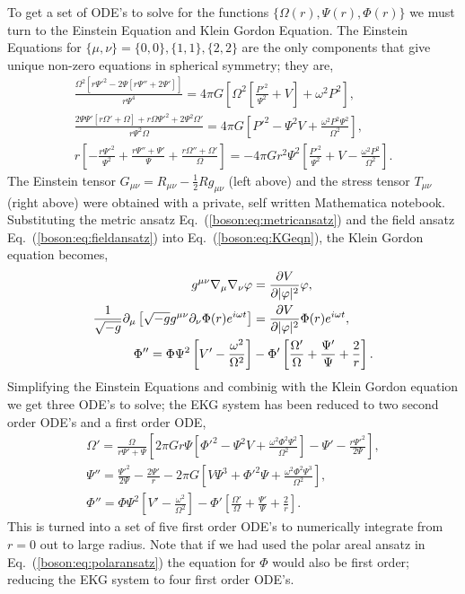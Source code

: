 To get a set of ODE's to solve for the functions $\{\Omega(r), \Psi(r),\Phi(r)\}$ we must turn to the Einstein Equation and Klein Gordon Equation. The Einstein Equations for $\{\mu,\nu\}=\{0,0\},\{1,1\},\{2,2\}$ are the only components that give unique non-zero equations in spherical symmetry; they are,
\begin{gather}
\frac{\Omega ^2 \left[r \Psi '^2-2 \Psi  \left[r \Psi ''+2 \Psi '\right]\right]}{r \Psi ^4} = 4\pi G \left[\Omega ^2 \left[\frac{P'^2}{\Psi ^2}+V\right]+\omega ^2 P^2\right],\\
\frac{2 \Psi  \Psi ' \left[r \Omega '+\Omega \right]+r \Omega  \Psi '^2+2 \Psi ^2 \Omega
   '}{r \Psi ^2 \Omega } = 4\pi G \left[P'^2-\Psi ^2 V+\frac{\omega ^2 P^2 \Psi ^2}{\Omega
   ^2}\right],\\
   r \left[-\frac{r \Psi '^2}{\Psi ^2}+\frac{r \Psi ''+\Psi '}{\Psi }+\frac{r \Omega ''+\Omega
   '}{\Omega }\right] = -4\pi G r^2 \Psi ^2 \left[\frac{P'^2}{\Psi ^2}+V-\frac{\omega ^2 P^2}{\Omega
   ^2}\right].
   \end{gather}
  The Einstein tensor $G_{\mu\nu} = R_{\mu\nu}-\frac{1}{2}R g_{\mu\nu}$ (left above) and the stress tensor $T_{\mu\nu}$ (right above) were obtained with a private, self written Mathematica notebook. Substituting the metric ansatz Eq.~(\ref{boson:eq:metricansatz}) and the field ansatz Eq.~(\ref{boson:eq:fieldansatz}) into Eq.~(\ref{boson:eq:KGeqn}), the Klein Gordon equation becomes,
  \begin{align}
  g^{\mu\nu}\nabla_\mu\nabla_\nu \varphi &= \frac{\partial V}{\partial |\varphi|^2}\varphi ,\\
   \frac{1}{\sqrt{-g}}\partial_\mu \left[ \sqrt{-g}g^{\mu\nu}\partial_\nu \Phi(r)e^{i\omega t}\right] &= \frac{\partial V}{\partial |\varphi|^2} \Phi(r)e^{i\omega t} ,\\
  \Phi'' = \Phi\Psi^2\left[V'-\frac{\omega^2}{\Omega^2}\right] &- \Phi'\left[\frac{\Omega'}{\Omega} +\frac{\Psi'}{\Psi}+\frac{2}{r} \right].
  \end{align}
Simplifying the Einstein Equations and combinig with the Klein Gordon equation we get three ODE's to solve; the EKG system has been reduced to two second order ODE's and a first order ODE,
\begin{gather}\Omega '=\frac{\Omega}{r\Psi'+\Psi}\left[2 \pi  G r \Psi \left[\Phi'^2 -\Psi^2 
   V+\frac{\omega ^2 \Phi^2 \Psi^2}{\Omega^2} \right]  -\Psi '-\frac{r \Psi '^2}{2 \Psi} \right]
,\\{ \Psi'' = \frac{\Psi'^2}{2\Psi} - \frac{2\Psi'}{r}-2\pi G \left[V \Psi^3 + \Phi'^2\Psi+ \frac{ \omega^2\Phi^2\Psi^3}{\Omega^2}\right] }
,\\ \Phi'' = \Phi\Psi^2\left[V'-\frac{\omega^2}{\Omega^2}\right] - \Phi'\left[\frac{\Omega'}{\Omega} +\frac{\Psi'}{\Psi}+\frac{2}{r} \right].\end{gather}
This is turned into a set of five first order ODE's to numerically integrate from $r=0$ out to large radius. Note that if we had used the polar areal ansatz in Eq.~(\ref{boson:eq:polaransatz}) the equation for $\Phi$ would also be first order; reducing the EKG system to four first order ODE's.

